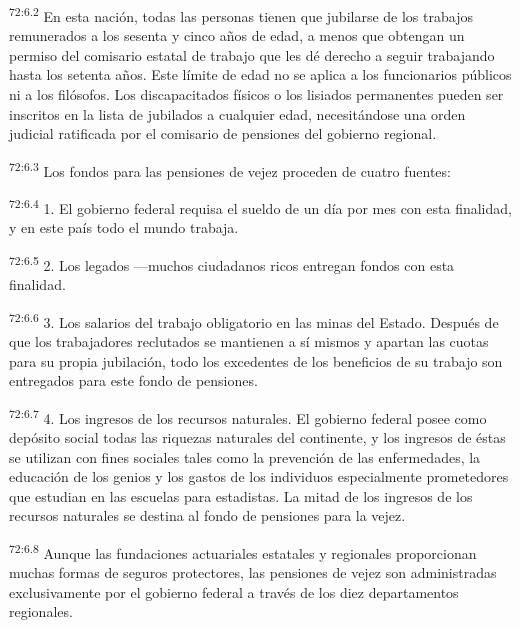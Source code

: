 \documentclass[twoside, 11pt]{book}
\begin{document}
\par
\textsuperscript{72:6.2} En esta nación, todas las personas tienen que jubilarse de los trabajos remunerados a los sesenta y cinco años de edad, a menos que obtengan un permiso del comisario estatal de trabajo que les dé derecho a seguir trabajando hasta los setenta años. Este límite de edad no se aplica a los funcionarios públicos ni a los filósofos. Los discapacitados físicos o los lisiados permanentes pueden ser inscritos en la lista de jubilados a cualquier edad, necesitándose una orden judicial ratificada por el comisario de pensiones del gobierno regional.

\par
\textsuperscript{72:6.3} Los fondos para las pensiones de vejez proceden de cuatro fuentes:

\par
\textsuperscript{72:6.4} 1. El gobierno federal requisa el sueldo de un día por mes con esta finalidad, y en este país todo el mundo trabaja.

\par
\textsuperscript{72:6.5} 2. Los legados ---muchos ciudadanos ricos entregan fondos con esta finalidad.

\par
\textsuperscript{72:6.6} 3. Los salarios del trabajo obligatorio en las minas del Estado. Después de que los trabajadores reclutados se mantienen a sí mismos y apartan las cuotas para su propia jubilación, todo los excedentes de los beneficios de su trabajo son entregados para este fondo de pensiones.

\par
\textsuperscript{72:6.7} 4. Los ingresos de los recursos naturales. El gobierno federal posee como depósito social todas las riquezas naturales del continente, y los ingresos de éstas se utilizan con fines sociales tales como la prevención de las enfermedades, la educación de los genios y los gastos de los individuos especialmente prometedores que estudian en las escuelas para estadistas. La mitad de los ingresos de los recursos naturales se destina al fondo de pensiones para la vejez.

\par
\textsuperscript{72:6.8} Aunque las fundaciones actuariales estatales y regionales proporcionan muchas formas de seguros protectores, las pensiones de vejez son administradas exclusivamente por el gobierno federal a través de los diez departamentos regionales.
\end{document}

